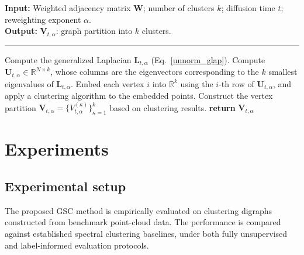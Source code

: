 \documentclass[10pt]{article} %
\def\rmL{{\mathbf{L}}}
\def\rmU{{\mathbf{U}}}
\def\rmW{{\mathbf{W}}}
\newcommand{\GSC}{GSC\xspace}
\begin{document}
\begin{algorithm}[tb]\small
  \caption{Generalized Spectral Clustering (\GSC)}
  \label{gsc_algo}
  \textbf{Input:} Weighted adjacency matrix $\rmW$; number of clusters $k$; diffusion time $t$; reweighting exponent $\alpha$.\\
  \textbf{Output:} $\boldsymbol{V}_{t,\alpha}$: graph partition into $k$ clusters.
  \vspace{0.5mm}
  \hrule
  \begin{algorithmic}[1]
    \STATE Compute the generalized Laplacian $\rmL_{t,\alpha}$ (Eq.~\ref{unnorm_glap}).
    \STATE Compute $\rmU_{t,\alpha} \in \mathbb{R}^{N \times k}$, whose columns are the eigenvectors corresponding to the $k$ smallest eigenvalues of $\rmL_{t,\alpha}$.
    \STATE Embed each vertex $i$ into $\mathbb{R}^k$ using the $i$-th row of $\rmU_{t,\alpha}$, and apply a clustering algorithm %
		to the embedded points.
    \STATE Construct the vertex partition $\boldsymbol{V}_{t,\alpha} = \{V^{(\kappa)}_{t,\alpha}\}_{\kappa=1}^k$ based on clustering results.
    \STATE \textbf{return} $\boldsymbol{V}_{t,\alpha}$
  \end{algorithmic}
\end{algorithm}

\section{Experiments}
\label{exps_benchmark}

\subsection{Experimental setup}

The proposed \GSC method is empirically evaluated on clustering digraphs constructed from benchmark point-cloud data. The performance is compared against established spectral clustering baselines, under both fully unsupervised and label-informed evaluation protocols.
\end{document}
